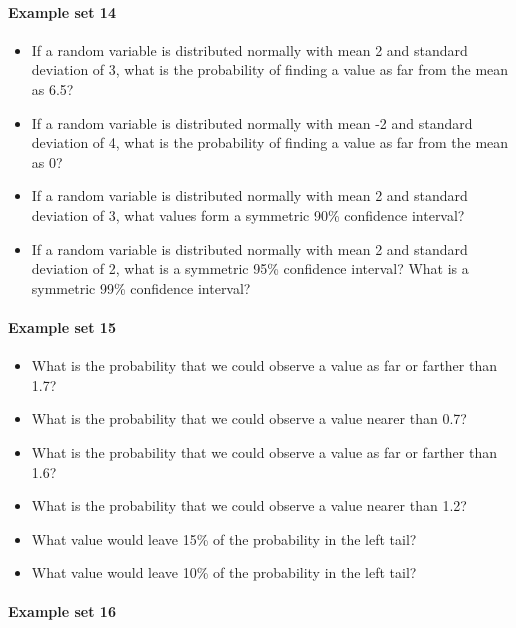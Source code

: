 \documentclass[]{article}
\providecommand{\tightlist}{%
  \setlength{\itemsep}{0pt}\setlength{\parskip}{0pt}}
\let\oldparagraph\paragraph
\renewcommand{\paragraph}[1]{\oldparagraph{#1}\mbox{}}
\begin{document}
\paragraph{Example set 14}\label{example-set-14}

\begin{itemize}
\tightlist
\item
  If a random variable is distributed normally with mean 2 and standard
  deviation of 3, what is the probability of finding a value as far from
  the mean as 6.5?
\item
  If a random variable is distributed normally with mean -2 and standard
  deviation of 4, what is the probability of finding a value as far from
  the mean as 0?
\item
  If a random variable is distributed normally with mean 2 and standard
  deviation of 3, what values form a symmetric 90\% confidence interval?
\item
  If a random variable is distributed normally with mean 2 and standard
  deviation of 2, what is a symmetric 95\% confidence interval? What is
  a symmetric 99\% confidence interval?
\end{itemize}

\paragraph{Example set 15}\label{example-set-15}

\begin{itemize}
\tightlist
\item
  What is the probability that we could observe a value as far or
  farther than 1.7?
\item
  What is the probability that we could observe a value nearer than 0.7?
\item
  What is the probability that we could observe a value as far or
  farther than 1.6?
\item
  What is the probability that we could observe a value nearer than 1.2?
\item
  What value would leave 15\% of the probability in the left tail?
\item
  What value would leave 10\% of the probability in the left tail?
\end{itemize}

\paragraph{Example set 16}\label{example-set-16}
\end{document}
